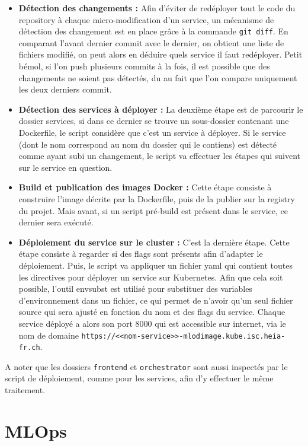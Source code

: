\begin{itemize}
    \item \textbf{Détection des changements : }Afin d'éviter de redéployer tout le code du repository à chaque micro-modification d'un service, un mécanisme de détection des changement est en place grâce à la commande \verb|git diff|. En comparant l'avant dernier commit avec le dernier, on obtient une liste de fichiers modifié, on peut alors en déduire quels service il faut redéployer. Petit bémol, si l'on push plusieurs commits à la fois, il est possible que des changements ne soient pas détectés, du au fait que l'on compare uniquement les deux derniers commit.
    \item \textbf{Détection des services à déployer : } La deuxième étape est de parcourir le dossier services, si dans ce dernier se trouve un sous-dossier contenant une Dockerfile, le script considère que c'est un service à déployer. Si le service (dont le nom correspond au nom du dossier qui le contiens) est détecté comme ayant subi un changement, le script va effectuer les étapes qui suivent sur le service en question.
    \item \textbf{Build et publication des images Docker : } Cette étape consiste à construire l'image décrite par la Dockerfile, puis de la publier sur la registry du projet. Mais avant, si un script pré-build est présent dans le service, ce dernier sera exécuté.
    \item \textbf{Déploiement du service sur le cluster : }C'est la dernière étape. Cette étape consiste à regarder si des flags sont présents afin d'adapter le déploiement. Puis, le script va appliquer un fichier yaml qui contient toutes les directives pour déployer un service sur Kubernetes. Afin que cela soit possible, l'outil envsubst est utilisé pour substituer des variables d'environnement dans un fichier, ce qui permet de n'avoir qu'un seul fichier source qui sera ajusté en fonction du nom et des flags du service. Chaque service déployé a alors son port 8000 qui est accessible sur internet, via le nom de domaine \verb|https://<<nom-service>>-mlodimage.kube.isc.heia-fr.ch|.
\end{itemize}

A noter que les dossiers \verb|frontend| et \verb|orchestrator| sont aussi inspectés par le script de déploiement, comme pour les services, afin d'y effectuer le même traitement.

\section{MLOps}

